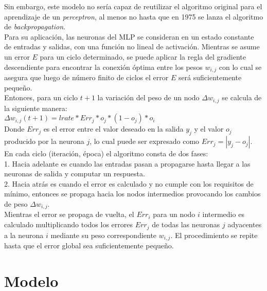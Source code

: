 \documentclass{llncs}
\begin{document}
\begin{multicols}{2}[]

Sin embargo, este modelo no ser\'ia capaz de reutilizar el algoritmo original para el aprendizaje de un \textit{perceptron}, al menos no hasta que en 1975 se lanza el
algoritmo de \textit{backpropagation}. \\

Para su aplicaci\'on, las neuronas del MLP se consideran en un estado constante de entradas y salidas, con una funci\'on no lineal de activaci\'on. Mientras se
asume un error $E$ para un ciclo determinado, se puede aplicar la regla del gradiente descendiente para encontrar la conexi\'on \'optima entre los pesos $w_{i,j}$
con lo cual se asegura que luego de n\'umero finito de ciclos el error $E$ ser\'a suficientemente peque\~no.\\

Entonces, para un ciclo $t+1$ la variaci\'on del peso de un nodo $\Delta w_{i,j}$ se calcula de la siguiente manera: \\

$\Delta w_{i,j} (t + 1) = lrate * Err_{j} * o_j * (1 - o_j) * o_i$ \\

Donde $Err_j$ es el error entre el valor deseado en la salida $y_j$ y el valor $o_j$ producido por la neurona $j$, lo cual puede ser expresado como $Err_j = |y_j - o_j|$. \\

En cada ciclo (iteraci\'on, \'epoca) el algoritmo consta de dos fases:\\

1. Hacia adelante es cuando las entradas pasan a propagarse hasta llegar a las neuronas de salida y computar un respuesta. \\

2. Hacia atr\'as es cuando el error es calculado y no cumple con los requisitos de m\'inimo, entonces se propaga hacia los nodos intermedios provocando los cambios
de peso $\Delta w_{i,j}.$\\

Mientras el error se propaga de vuelta, el $Err_i$ para un nodo $i$ intermedio es calculado multiplicando todos los errores $Err_j$ de todas las neuronas $j$ adyacentes
a la neurona $i$ mediante su peso correspondiente $w_{i,j}$. El procedimiento se repite hasta que el error global sea suficientemente peque\~no. \\

\section{Modelo}


\end{multicols}
\end{document}
